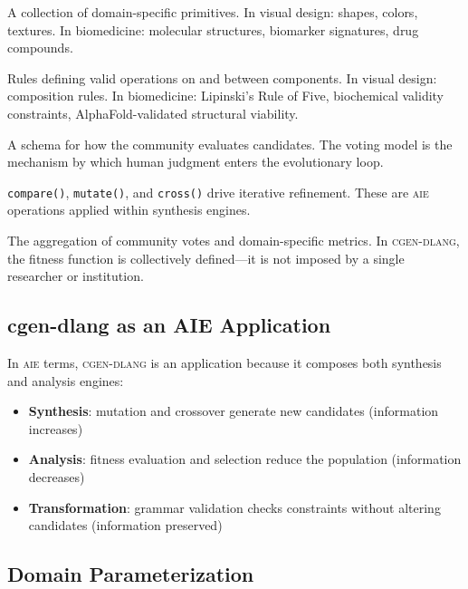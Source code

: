 \documentclass[11pt,letterpaper]{article}
\newcommand{\aie}{\textsc{aie}}
\newcommand{\cgen}{\textsc{cgen-dlang}}
\begin{document}
\begin{description}[leftmargin=*,style=nextline]
  \item[Component Library] A collection of domain-specific primitives. In visual design: shapes, colors, textures. In biomedicine: molecular structures, biomarker signatures, drug compounds.
  \item[Component Grammar] Rules defining valid operations on and between components. In visual design: composition rules. In biomedicine: Lipinski's Rule of Five, biochemical validity constraints, AlphaFold-validated structural viability.
  \item[Voting Model] A schema for how the community evaluates candidates. The voting model is the mechanism by which human judgment enters the evolutionary loop.
  \item[Evolutionary Operators] \texttt{compare()}, \texttt{mutate()}, and \texttt{cross()} drive iterative refinement. These are \aie{} operations applied within synthesis engines.
  \item[Fitness Function] The aggregation of community votes and domain-specific metrics. In \cgen{}, the fitness function is collectively defined---it is not imposed by a single researcher or institution.
\end{description}

\subsection{cgen-dlang as an AIE Application}

In \aie{} terms, \cgen{} is an application because it composes both synthesis and analysis engines:

\begin{itemize}[leftmargin=*]
  \item \textbf{Synthesis}: mutation and crossover generate new candidates (information increases)
  \item \textbf{Analysis}: fitness evaluation and selection reduce the population (information decreases)
  \item \textbf{Transformation}: grammar validation checks constraints without altering candidates (information preserved)
\end{itemize}

\subsection{Domain Parameterization}
\end{document}
